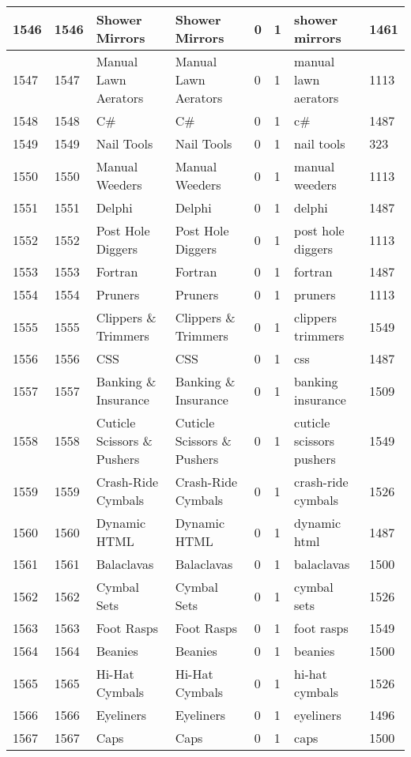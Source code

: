 \begin{longtable}{|l|l|l|l|l|l|l|l|}
1546 & 1546 & Shower Mirrors & Shower Mirrors & 0 & 1 & shower mirrors & 1461 \\ \hline 
1547 & 1547 & Manual Lawn Aerators & Manual Lawn Aerators & 0 & 1 & manual lawn aerators & 1113 \\ \hline 
1548 & 1548 & C\# & C\# & 0 & 1 & c\# & 1487 \\ \hline 
1549 & 1549 & Nail Tools & Nail Tools & 0 & 1 & nail tools & 323 \\ \hline 
1550 & 1550 & Manual Weeders & Manual Weeders & 0 & 1 & manual weeders & 1113 \\ \hline 
1551 & 1551 & Delphi & Delphi & 0 & 1 & delphi & 1487 \\ \hline 
1552 & 1552 & Post Hole Diggers & Post Hole Diggers & 0 & 1 & post hole diggers & 1113 \\ \hline 
1553 & 1553 & Fortran & Fortran & 0 & 1 & fortran & 1487 \\ \hline 
1554 & 1554 & Pruners & Pruners & 0 & 1 & pruners & 1113 \\ \hline 
1555 & 1555 & Clippers \& Trimmers & Clippers \& Trimmers & 0 & 1 & clippers trimmers & 1549 \\ \hline 
1556 & 1556 & CSS & CSS & 0 & 1 & css & 1487 \\ \hline 
1557 & 1557 & Banking \& Insurance & Banking \& Insurance & 0 & 1 & banking insurance & 1509 \\ \hline 
1558 & 1558 & Cuticle Scissors \& Pushers & Cuticle Scissors \& Pushers & 0 & 1 & cuticle scissors pushers & 1549 \\ \hline 
1559 & 1559 & Crash-Ride Cymbals & Crash-Ride Cymbals & 0 & 1 & crash-ride cymbals & 1526 \\ \hline 
1560 & 1560 & Dynamic HTML & Dynamic HTML & 0 & 1 & dynamic html & 1487 \\ \hline 
1561 & 1561 & Balaclavas & Balaclavas & 0 & 1 & balaclavas & 1500 \\ \hline 
1562 & 1562 & Cymbal Sets & Cymbal Sets & 0 & 1 & cymbal sets & 1526 \\ \hline 
1563 & 1563 & Foot Rasps & Foot Rasps & 0 & 1 & foot rasps & 1549 \\ \hline 
1564 & 1564 & Beanies & Beanies & 0 & 1 & beanies & 1500 \\ \hline 
1565 & 1565 & Hi-Hat Cymbals & Hi-Hat Cymbals & 0 & 1 & hi-hat cymbals & 1526 \\ \hline 
1566 & 1566 & Eyeliners & Eyeliners & 0 & 1 & eyeliners & 1496 \\ \hline 
1567 & 1567 & Caps & Caps & 0 & 1 & caps & 1500 \\ \hline 

\end{longtable}
